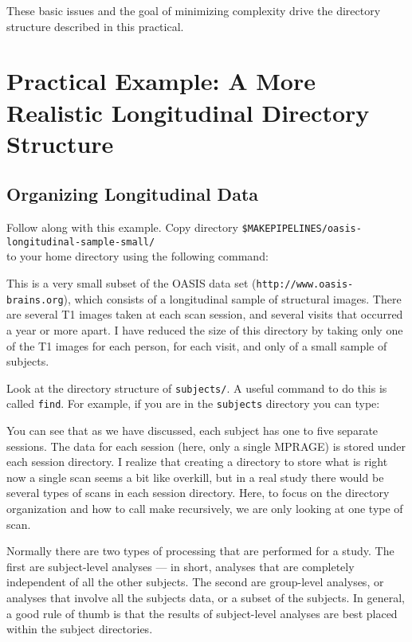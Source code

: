 These basic issues and the goal of minimizing complexity drive the
directory structure described in this practical.


\section{Practical Example: A More Realistic Longitudinal Directory Structure}

\subsection{Organizing Longitudinal Data}

Follow along with this example. Copy directory 
\newline\texttt{\$MAKEPIPELINES/oasis-longitudinal-sample-small/} \\
to your home directory using the following command:

This is a very small subset of the OASIS data set (\texttt{http://www.oasis-brains.org}), which consists of a
longitudinal sample of structural images. There are several T1 images
taken at each scan session, and several visits that occurred a year or
more apart. I have reduced the size of this directory by taking only one of the T1 images
for each person, for each visit, and only of a small sample of
subjects.

Look at the directory structure of \texttt{subjects/}. A useful command to do this is called \texttt{find}. For example, if you are in the \texttt{subjects} directory you can type:

You can see that as we have discussed, each subject has one to five
separate sessions. The data for each session (here, only a single
MPRAGE) is stored under each session directory. I realize that
creating a directory to store what is right now a single scan seems a
bit like overkill, but in a real study there would be several types of
scans in each session directory. Here, to focus on the directory
organization and how to call make recursively, we are only looking at
one type of scan.

Normally there are two types of processing that are performed for a
study. The first are subject-level analyses --- in short, analyses that
are completely independent of all the other subjects. The second are
group-level analyses, or analyses that involve all the subjects
data, or a subset of the subjects. In general, a good rule of thumb is that the results of
subject-level analyses are best placed within the subject directories.

